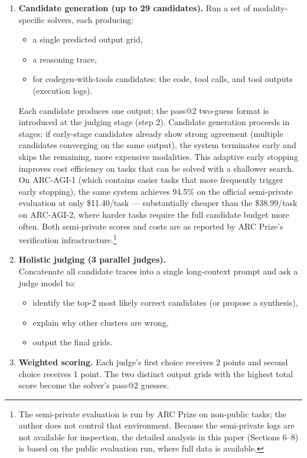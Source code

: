 \documentclass[11pt]{article}
\providecommand{\tightlist}{%
  \setlength{\itemsep}{0pt}\setlength{\parskip}{0pt}}
\begin{document}
\begin{enumerate}
\def\labelenumi{\arabic{enumi}.}
\item
  \textbf{Candidate generation (up to 29 candidates).} Run a set of
  modality-specific solvers, each producing:

  \begin{itemize}
  \tightlist
  \item
    a single predicted output grid,
  \item
    a reasoning trace,
  \item
    for codegen-with-tools candidates: the code, tool calls, and tool
    outputs (execution logs).
  \end{itemize}

  Each candidate produces one output; the pass@2 two-guess format is
  introduced at the judging stage (step 2). Candidate generation
  proceeds in stages: if early-stage candidates already show strong
  agreement (multiple candidates converging on the same output), the
  system terminates early and skips the remaining, more expensive
  modalities. This adaptive early stopping improves cost efficiency on
  tasks that can be solved with a shallower search. On ARC-AGI-1 (which
  contains easier tasks that more frequently trigger early stopping),
  the same system achieves 94.5\% on the official semi-private
  evaluation at only \$11.40/task --- substantially cheaper than the
  \$38.99/task on ARC-AGI-2, where harder tasks require the full
  candidate budget more often. Both semi-private scores and costs are as
  reported by ARC Prize's verification infrastructure.\footnote{The
    semi-private evaluation is run by ARC Prize on non-public tasks; the
    author does not control that environment. Because the semi-private
    logs are not available for inspection, the detailed analysis in this
    paper (Sections 6--8) is based on the public evaluation run, where
    full data is available.}
\item
  \textbf{Holistic judging (3 parallel judges).}\\
  Concatenate all candidate traces into a single long-context prompt and
  ask a judge model to:

  \begin{itemize}
  \tightlist
  \item
    identify the top-2 most likely correct candidates (or propose a
    synthesis),
  \item
    explain why other clusters are wrong,
  \item
    output the final grids.
  \end{itemize}
\item
  \textbf{Weighted scoring.} Each judge's first choice receives 2 points
  and second choice receives 1 point. The two distinct output grids with
  the highest total score become the solver's pass@2 guesses.
\end{enumerate}
\end{document}
